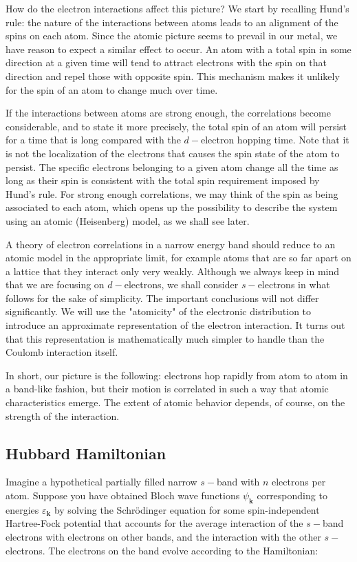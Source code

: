 How do the electron interactions affect this picture?
We start by recalling Hund's rule: the nature of the  interactions between atoms leads to an alignment of the spins on each atom.
Since the atomic picture seems to prevail in our metal, we have reason to expect a similar effect to occur.
An atom with a total spin in some direction at a given time will tend to attract electrons with the spin on that direction and repel those with opposite spin.
This mechanism makes it unlikely for the spin of an atom to change much over time.

If the interactions between atoms are strong enough, the correlations become considerable, and to state it more precisely, the total spin of an atom will persist for a time that is long compared with the $d-$electron hopping time.
Note that it is not the localization of the electrons that causes the spin state of the atom to persist.
The specific electrons belonging to a given atom change all the time as long as their spin is consistent with the total spin requirement imposed by Hund's rule.
For strong enough correlations, we may think of the spin as being associated to each atom, which opens up the possibility to describe the system using an atomic (Heisenberg) model, as we shall see later.

A theory of electron correlations in a narrow energy band should reduce to an atomic model in the appropriate limit, for example atoms that are so far apart on a lattice that they interact only very weakly.
Although we always keep in mind that we are focusing on $d-$electrons, we shall consider $s-$electrons in what follows for the sake of simplicity.
The important conclusions will not differ significantly.
We will use the "atomicity" of the electronic distribution to introduce an approximate representation of the electron interaction.
It turns out that this representation is mathematically much simpler to handle than the Coulomb interaction itself.

In short, our picture is the following: electrons hop rapidly from atom to atom in a band-like fashion, but their motion is correlated in such a way that atomic characteristics emerge.
The extent of atomic behavior depends, of course, on the strength of the interaction.

\subsection{Hubbard Hamiltonian}\label{hubbardHamiltonian}

Imagine a hypothetical partially filled narrow $s-$band with $n$ electrons per atom.
Suppose you have obtained Bloch wave functions $\psi_{\bm k}$ corresponding to energies $\varepsilon_{\bm k}$ by solving the Schr\"odinger equation for some spin-independent Hartree-Fock potential that accounts for the average interaction of the $s-$band electrons with electrons on other bands, and the interaction with the other $s-$electrons.
The electrons on the band evolve according to the Hamiltonian:

